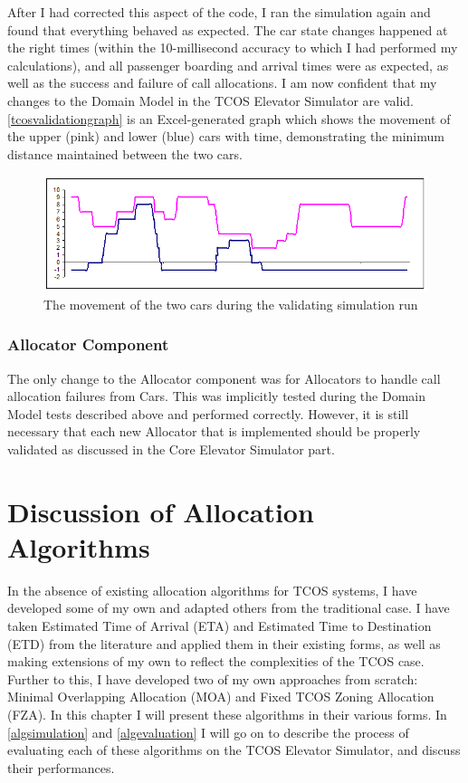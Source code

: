 \documentclass{UoYCSproject}
\begin{document}
After I had corrected this aspect of the code, I ran the simulation again and found that everything behaved as expected.  The car state changes happened at the right times (within the 10-millisecond accuracy to which I had performed my calculations), and all passenger boarding and arrival times were as expected, as well as the success and failure of call allocations.  I am now confident that my changes to the Domain Model in the TCOS Elevator Simulator are valid.  \autoref{tcosvalidationgraph} is an Excel-generated graph which shows the movement of the upper (pink) and lower (blue) cars with time, demonstrating the minimum distance maintained between the two cars.

\begin{figure} [h]
	\centering
	\includegraphics[width=\linewidth,keepaspectratio]{tcos_validation_movement_graph.png}
	\caption{The movement of the two cars during the validating simulation run}
	\label{tcosvalidationgraph}
\end{figure}

\subsection{Allocator Component}
The only change to the Allocator component was for Allocators to handle call allocation failures from Cars.  This was implicitly tested during the Domain Model tests described above and performed correctly.  However, it is still necessary that each new Allocator that is implemented should be properly validated as discussed in the Core Elevator Simulator part.

\chapter{Discussion of Allocation Algorithms}
\label{algdiscussion}

In the absence of existing allocation algorithms for TCOS systems, I have developed some of my own and adapted others from the traditional case.  I have taken Estimated Time of Arrival (ETA) and Estimated Time to Destination (ETD) from the literature and applied them in their existing forms, as well as making extensions of my own to reflect the complexities of the TCOS case.  Further to this, I have developed two of my own approaches from scratch: Minimal Overlapping Allocation (MOA) and Fixed TCOS Zoning Allocation (FZA).  In this chapter I will present these algorithms in their various forms.  In \autoref{algsimulation} and \autoref{algevaluation} I will go on to describe the process of evaluating each of these algorithms on the TCOS Elevator Simulator, and discuss their performances.
\end{document}
